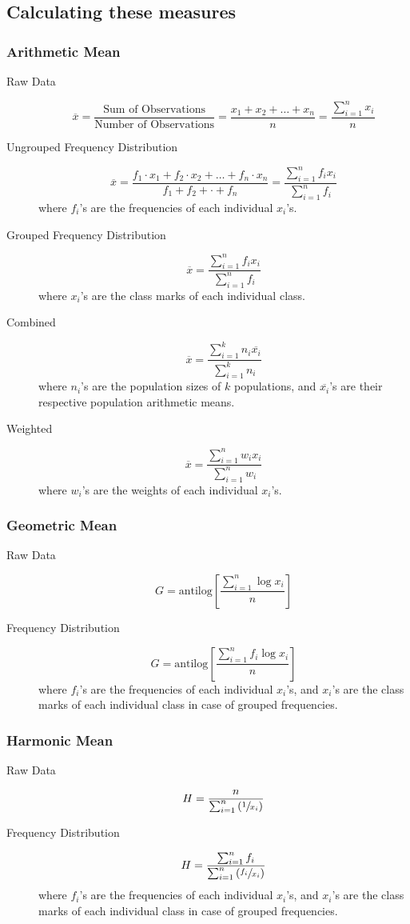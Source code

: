 \documentclass[
10pt, %
a4paper, %
]{report}
\begin{document}
\subsection*{Calculating these measures}

\subsubsection*{Arithmetic Mean}
\begin{description}
\item[Raw Data]
\[
\overline{x} = \frac{\text{Sum of Observations}}{\text{Number of Observations}} = \frac{x_1 + x_2 + \dots + x_n}{n} = \frac{\sum_{i=1}^n x_i}{n}
\]
\item[Ungrouped Frequency Distribution]
\[
\overline{x} = \frac{f_1 \cdot x_1 + f_2 \cdot x_2 + \dots + f_n \cdot x_n}{f_1 + f_2 + \cdot + f_n} = \frac{\sum_{i=1}^n f_i x_i}{\sum_{i=1}^n f_i}
\]
where \(f_i\)'s are the frequencies of each individual \(x_i\)'s.
\item[Grouped Frequency Distribution]
\[
\overline{x} = \frac{\sum_{i=1}^n f_i x_i}{\sum_{i=1}^n f_i}
\]
where \(x_i\)'s are the class marks of each individual class.
\item[Combined]
\[
\overline{x} = \frac{\sum_{i=1}^k n_i \overline{x_i}}{\sum_{i=1}^k n_i}
\]
where \(n_i\)'s are the population sizes of \(k\) populations, and \(\overline{x_i}\)'s are their respective population arithmetic means.
\item[Weighted]
\[
\overline{x} = \frac{\sum_{i=1}^n w_i x_i}{\sum_{i=1}^n w_i}
\]
where \(w_i\)'s are the weights of each individual \(x_i\)'s.
\end{description}

\subsubsection*{Geometric Mean}
\begin{description}
\item[Raw Data]
\[
G = \mathrm{antilog} \left[ \frac{\sum_{i=1}^n \log x_i}{n} \right]
\]
\item[Frequency Distribution]
\[
G = \mathrm{antilog} \left[ \frac{\sum_{i=1}^n f_i \log x_i}{n} \right]
\]
where \(f_i\)'s are the frequencies of each individual \(x_i\)'s, and \(x_i\)'s are the class marks of each individual class in case of grouped frequencies.
\end{description}

\subsubsection*{Harmonic Mean}
\begin{description}
\item[Raw Data]
\[
H = \dfrac{n}{\sum_{i=1}^n \left( \sfrac{1}{x_i} \right)}
\]
\item[Frequency Distribution]
\[
H = \dfrac{\sum_{i=1}^{n} f_i}{\sum_{i=1}^{n} \left( \sfrac{f_i}{x_i} \right)}
\]
where \(f_i\)'s are the frequencies of each individual \(x_i\)'s, and \(x_i\)'s are the class marks of each individual class in case of grouped frequencies.
\end{description}
\end{document}
